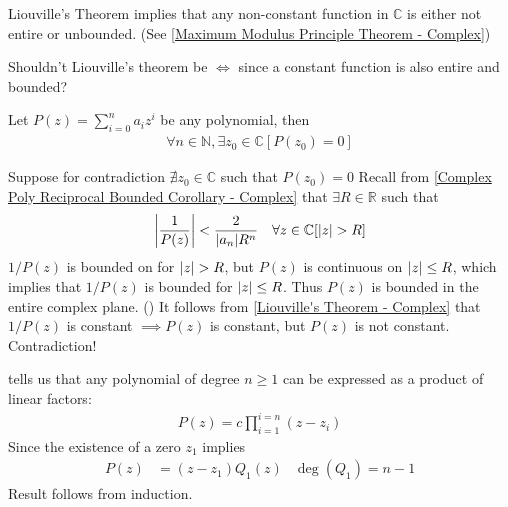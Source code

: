\documentclass[12pt, english]{book}
\makeatletter
\renewenvironment{proof}[1][\proofname]{\par
	\pushQED{\qed}%
	\normalfont \topsep6\p@\@plus6\p@\relax
	\list{}{%
		\settowidth{\leftmargin}{\itshape\proofname:\hskip\labelsep}%
		\setlength{\labelwidth}{0pt}%
		\setlength{\itemindent}{-\leftmargin}%
	}%
	\item[\hskip\labelsep\itshape#1\@addpunct{:}]\ignorespaces
}{%
	\popQED\endlist\@endpefalse
}
\makeatother
\begin{document}
	\begin{observation}
		Liouville's Theorem implies that any non-constant function in \(\mathbb{C}\) is either not entire or unbounded. (See \cref{Maximum Modulus Principle Theorem - Complex})
	\end{observation}

	\begin{question}
		Shouldn't Liouville's theorem be \(\iff\) since a constant function is also entire and bounded?
	\end{question}
	
	\begin{theorem}
		\label{Fundamental Theorem of Algebra - Complex}
		Let \(P(z) = \sum_{i=0}^{n} a_i z^i\) be any polynomial, then
		\begin{align*}
			\forall n \in \mathbb{N}, \exists z_0 \in \mathbb{C}[P(z_0) = 0]
		\end{align*}
	\end{theorem}
	\begin{proof}
		Suppose for contradiction \(\nexists z_0 \in \mathbb{C}\) such that \(P(z_0) = 0\)
		Recall from \cref{Complex Poly Reciprocal Bounded Corollary - Complex} that \(\exists R \in \mathbb{R}\) such that 
		\begin{align*}
			\abs{\frac{1}{P(z)}} &< \frac{2}{\abs{a_n} R^n} & \forall z \in \mathbb{C} [\abs{z} > R]
		\end{align*}
		\(1/P(z)\) is bounded on for \(\abs{z}>R\), but \(P(z)\) is continuous on \(\abs{z}\leq R\), which implies that \(1/P(z)\) is bounded for \(\abs{z}\leq R\). Thus \(P(z)\) is bounded in the entire complex plane. ()
		It follows from \cref{Liouville's Theorem - Complex} that \(1/P(z)\) is constant \(\implies P(z)\) is constant, but \(P(z)\) is not constant. Contradiction!
	\end{proof}

	 tells us that any polynomial of degree \(n\geq 1\) can be expressed as a product of linear factors:
	\begin{align*}
		P(z) = c \prod_{i = 1}^{i=n} (z-z_i)
	\end{align*}
	Since the existence of a zero \(z_1\) implies 
	\begin{align*}
		P(z) &= (z-z_1)Q_1(z) & \deg (Q_1) = n-1
	\end{align*}
	Result follows from induction.
	
\end{document}
